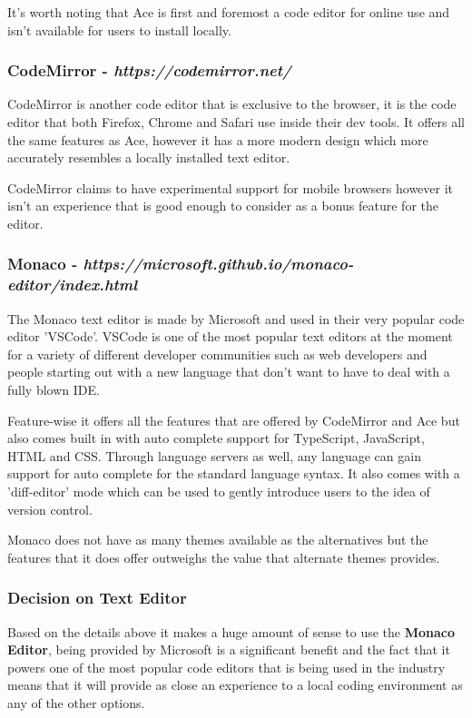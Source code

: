 It's worth noting that Ace is first and foremost a code editor for online use and isn't available for users to install locally.

\subsubsection{CodeMirror - \textit{https://codemirror.net/}}

CodeMirror is another code editor that is exclusive to the browser, it is the code editor that both Firefox, Chrome and Safari use inside their dev tools. It offers all the same features as Ace, however it has a more modern design which more accurately resembles a locally installed text editor.

CodeMirror claims to have experimental support for mobile browsers however it isn't an experience that is good enough to consider as a bonus feature for the editor.

\subsubsection{Monaco - \textit{https://microsoft.github.io/monaco-editor/index.html}}

The Monaco text editor is made by Microsoft and used in their very popular code editor 'VSCode'. VSCode is one of the most popular text editors at the moment for a variety of different developer communities such as web developers and people starting out with a new language that don't want to have to deal with a fully blown IDE.

Feature-wise it offers all the features that are offered by CodeMirror and Ace but also comes built in with auto complete support for TypeScript, JavaScript, HTML and CSS. Through language servers as well, any language can gain support for auto complete for the standard language syntax. It also comes with a 'diff-editor' mode which can be used to gently introduce users to the idea of version control.

Monaco does not have as many themes available as the alternatives but the features that it does offer outweighs the value that alternate themes provides.

\subsubsection{Decision on Text Editor}

Based on the details above it makes a huge amount of sense to use the \textbf{Monaco Editor}, being provided by Microsoft is a significant benefit and the fact that it powers one of the most popular code editors that is being used in the industry means that it will provide as close an experience to a local coding environment as any of the other options.

